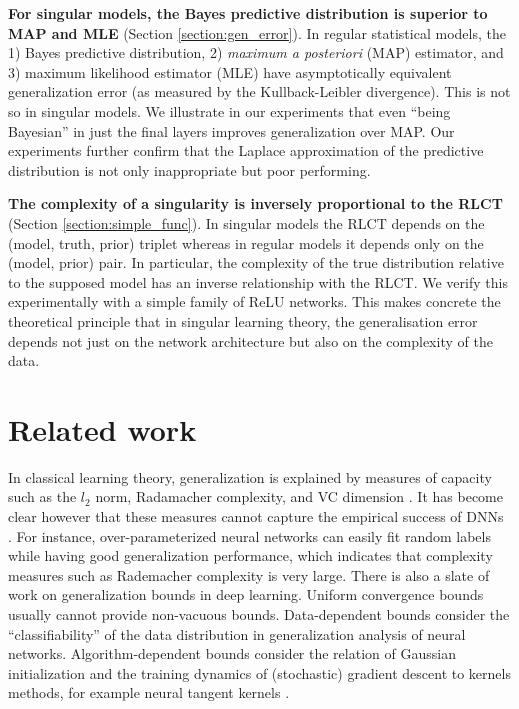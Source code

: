 \documentclass{article} %
\begin{document}
\textbf{For singular models, the Bayes predictive distribution is superior to MAP and MLE} (Section \ref{section:gen_error}). In regular statistical models,  the 1) Bayes predictive distribution, 2) \textit{maximum a posteriori} (MAP) estimator, and 3) maximum likelihood estimator (MLE) have asymptotically equivalent generalization error (as measured by the Kullback-Leibler divergence). This is not so in singular models. We illustrate in our experiments that even ``being Bayesian'' in just the final layers improves generalization over MAP. Our experiments further confirm that the Laplace approximation of the predictive distribution \citet{le_bayesian_2018,zhang_energyentropy_2018} is not only inappropriate but poor performing.

\textbf{The complexity of a singularity is inversely proportional to the RLCT} (Section \ref{section:simple_func}). In singular models the RLCT depends on the (model, truth, prior) triplet whereas in regular models it depends only on the (model, prior) pair. In particular, the complexity of the true distribution relative to the supposed model has an inverse relationship with the RLCT. We verify this experimentally with a simple family of ReLU networks. This makes concrete the theoretical principle that in singular learning theory, the generalisation error depends not just on the network architecture but also on the complexity of the data. %

\section{Related work}
In classical learning theory, generalization is explained by measures of capacity such as the $l_2$ norm, Radamacher complexity, and VC dimension \citep{bousquet2003introduction}. It has become clear however that these measures cannot capture the empirical success of DNNs \citep{zhang_understanding_2017}. 
For instance, over-parameterized neural networks can easily fit random labels \cite{zhang2016understanding,du2018gradient,allen2019convergence} while having good generalization performance, which indicates that complexity measures such as Rademacher complexity is very large.
There is also a slate of work on generalization bounds in deep learning. Uniform convergence bounds \citep{neyshabur2015norm,bartlett2017spectrally,neyshabur2018towards,neyshabur2019towards,arora2018stronger} usually cannot provide non-vacuous bounds.
Data-dependent bounds \citep{brutzkus2017sgd,li2018learning,allen2019learning} consider the ``classifiability'' of the data distribution in generalization analysis of neural networks.
Algorithm-dependent bounds \cite{daniely2017sgd,arora2019fine,yehudai2019power,cao2019generalization} consider the relation of Gaussian initialization and the training dynamics of (stochastic) gradient descent to kernels methods, for example neural tangent kernels \cite{jacot2018neural}.
\end{document}
